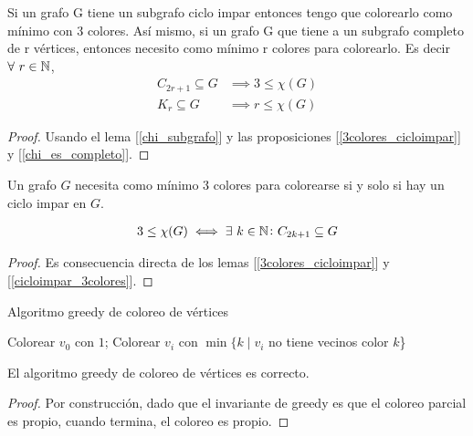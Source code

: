 \begin{lemma}\label{cicloimpar_3colores}
Si un grafo G tiene un subgrafo ciclo impar entonces tengo que colorearlo como mínimo con 3 colores.
Así mismo, si un grafo G que tiene a un subgrafo completo de r vértices, entonces necesito como mínimo r colores para colorearlo. Es decir $\forall~ r \in \mathbb{N}$,
\begin{align}
        C_{2r+1} \subseteq G &\implies 3 \le \chi(G) \\
        K_r \subseteq G      &\implies r \le \chi(G)
\end{align}
\end{lemma}
\begin{proof}
Usando el lema [\ref{chi_subgrafo}] y las proposiciones [\ref{3colores_cicloimpar}] y [\ref{chi_es_completo}].
\end{proof}

\begin{proposition}
 Un grafo $G$ necesita como mínimo 3 colores para colorearse si y solo si hay un ciclo impar en $G$.

\begin{align}
    3 \le \chi(G) \iff \exists~ k \in \mathbb{N}\colon C_{2k+1} \subseteq G
\end{align}
\end{proposition}

\begin{proof}
Es consecuencia directa de los lemas [\ref{3colores_cicloimpar}] y [\ref{cicloimpar_3colores}].
\end{proof}


\begin{algorithm}
\caption{Algoritmo greedy de coloreo de vértices}
\begin{algorithmic}
    \State Colorear $v_0$ con $1$;
    \State Colorear $v_i$ con $\min \{k \mid v_i $ no tiene vecinos color $k$\}
    \EndFor
\EndFunction
\end{algorithmic}
\end{algorithm}

\begin{proposition}
El algoritmo greedy de coloreo de vértices es correcto.
\end{proposition}
\begin{proof}
Por construcción, dado que el invariante de greedy es que el coloreo parcial es propio, cuando termina, el coloreo es propio.
\end{proof}

